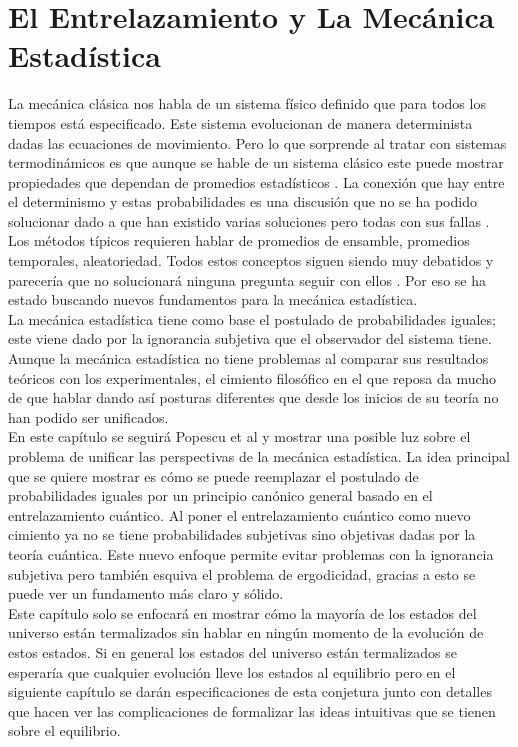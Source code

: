 \chapter{El Entrelazamiento y La Mecánica Estadística} \label{cap:2}

La mecánica clásica nos habla de un sistema físico definido que para todos los tiempos está especificado. Este sistema evolucionan de manera determinista dadas las ecuaciones de movimiento. Pero lo que sorprende al tratar con  sistemas termodinámicos es que aunque se hable de un sistema clásico este puede mostrar propiedades que dependan de promedios estadísticos \cite{CallenThermo}. La conexión que hay entre el determinismo y estas probabilidades es una discusión que no se ha podido solucionar dado a que han existido varias soluciones pero todas con sus fallas . Los métodos típicos requieren hablar de promedios de ensamble, promedios temporales, aleatoriedad. Todos estos conceptos siguen siendo muy debatidos y parecería que no solucionará ninguna pregunta seguir con ellos \cite{TodaStat}. Por eso se ha estado buscando nuevos fundamentos para la mecánica estadística.
\\
La mecánica estadística tiene como base el postulado de probabilidades iguales; este viene dado por la ignorancia subjetiva que el observador del sistema tiene. Aunque la mecánica estadística no tiene problemas al comparar sus resultados teóricos con los experimentales, el cimiento filosófico en el que reposa da mucho de que hablar dando así posturas diferentes que desde los inicios de su teoría no han podido ser unificados. 
\\
En este capítulo se seguirá Popescu et al  \cite{Popescu2006} y mostrar una posible luz sobre el problema de unificar las perspectivas de la mecánica estadística. La idea principal que se quiere mostrar es cómo se puede reemplazar el postulado de probabilidades iguales por un principio canónico general basado en el entrelazamiento cuántico. Al poner el entrelazamiento cuántico como nuevo cimiento ya no se tiene probabilidades subjetivas sino objetivas dadas por la teoría  cuántica. Este nuevo enfoque permite evitar problemas con la ignorancia subjetiva pero también esquiva el problema de ergodicidad, gracias a esto se puede ver un fundamento más claro y sólido. 
\\
Este capítulo solo se enfocará en mostrar cómo la mayoría de los estados del universo están termalizados sin hablar en ningún momento de la evolución de estos estados. Si en general los estados del universo están termalizados se esperaría que cualquier evolución lleve los estados al equilibrio pero en el siguiente capítulo se darán especificaciones de esta conjetura junto con detalles que hacen ver las complicaciones de formalizar las ideas intuitivas que se tienen sobre el equilibrio.
\\
